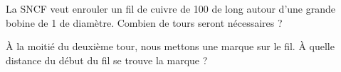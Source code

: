     La SNCF veut enrouler un fil de cuivre de \unit{100}{\meter} de long autour d'une grande bobine de \unit{1}{\meter} de diamètre. Combien de tours seront nécessaires ?

    À la moitié du deuxième tour, nous mettons une marque sur le fil. À quelle distance du début du fil se trouve la marque ?

